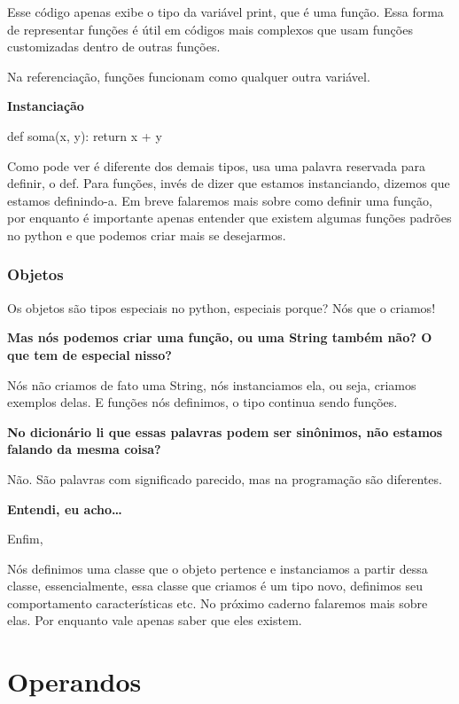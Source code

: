 \documentclass[
  letterpaper,
  DIV=11,
  numbers=noendperiod]{scrreprt}
\begin{document}
Esse código apenas exibe o tipo da variável print, que é uma função.
Essa forma de representar funções é útil em códigos mais complexos que
usam funções customizadas dentro de outras funções.

Na referenciação, funções funcionam como qualquer outra variável.

\textbf{Instanciação}

def soma(x, y): return x + y

Como pode ver é diferente dos demais tipos, usa uma palavra reservada
para definir, o def. Para funções, invés de dizer que estamos
instanciando, dizemos que estamos definindo-a. Em breve falaremos mais
sobre como definir uma função, por enquanto é importante apenas entender
que existem algumas funções padrões no python e que podemos criar mais
se desejarmos.

\hypertarget{objetos}{%
\subsection{Objetos}\label{objetos}}

Os objetos são tipos especiais no python, especiais porque? Nós que o
criamos!

\textbf{Mas nós podemos criar uma função, ou uma String também não? O
que tem de especial nisso?}

Nós não criamos de fato uma String, nós instanciamos ela, ou seja,
criamos exemplos delas. E funções nós definimos, o tipo continua sendo
funções.

\textbf{No dicionário li que essas palavras podem ser sinônimos, não
estamos falando da mesma coisa?}

Não. São palavras com significado parecido, mas na programação são
diferentes.

\textbf{Entendi, eu acho\ldots{}}

Enfim,

Nós definimos uma classe que o objeto pertence e instanciamos a partir
dessa classe, essencialmente, essa classe que criamos é um tipo novo,
definimos seu comportamento características etc. No próximo caderno
falaremos mais sobre elas. Por enquanto vale apenas saber que eles
existem.


\hypertarget{operandos}{%
\chapter{Operandos}\label{operandos}}
\end{document}
